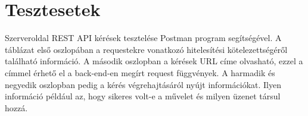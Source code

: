 
\section{Tesztesetek}
Szerveroldal REST API kérések tesztelése Postman program segítségével. A táblázat első oszlopában a requestekre vonatkozó hitelesítési kötelezettségéről található információ. A második oszlopban a kérések URL címe olvasható, ezzel a címmel érhető el a back-end-en megírt request függvények.  A harmadik és negyedik oszlopban pedig a kérés végrehajtásáról nyújt információkat. Ilyen információ például az, hogy sikeres volt-e a művelet és milyen üzenet társul hozzá.

